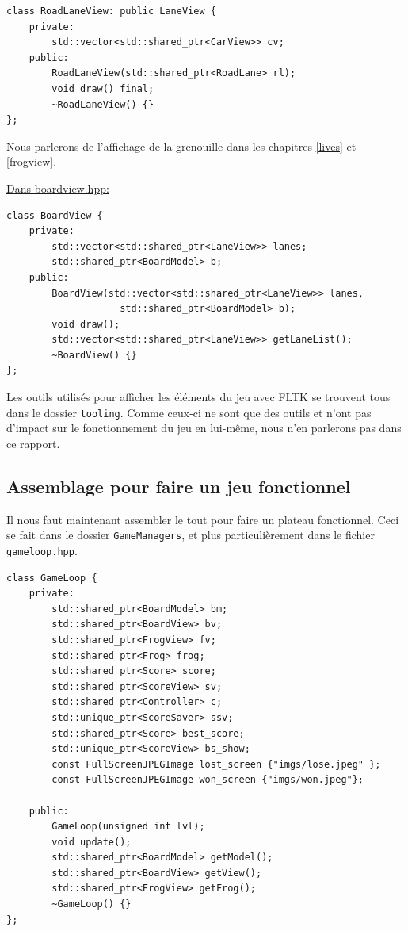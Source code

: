 \documentclass[a4paper, 12pt]{article}
\begin{document}
\begin{lstlisting}
class RoadLaneView: public LaneView {
    private:
        std::vector<std::shared_ptr<CarView>> cv;
    public:
        RoadLaneView(std::shared_ptr<RoadLane> rl);
        void draw() final;
        ~RoadLaneView() {}
};
\end{lstlisting}

Nous parlerons de l'affichage de la grenouille dans les chapitres 
\ref{lives} et \ref{frogview}. \\

\pagebreak

\underline{Dans boardview.hpp:}

\begin{lstlisting}
class BoardView {
    private:
        std::vector<std::shared_ptr<LaneView>> lanes;
        std::shared_ptr<BoardModel> b;
    public:
        BoardView(std::vector<std::shared_ptr<LaneView>> lanes,
                    std::shared_ptr<BoardModel> b);
        void draw();
        std::vector<std::shared_ptr<LaneView>> getLaneList();
        ~BoardView() {}
};
\end{lstlisting}

Les outils utilisés pour afficher les éléments du jeu avec FLTK se trouvent tous 
dans le dossier \texttt{tooling}. 
Comme ceux-ci ne sont que des outils et n'ont pas d'impact sur le fonctionnement 
du jeu en lui-même, 
nous n'en parlerons pas dans ce rapport.

\subsection{Assemblage pour faire un jeu fonctionnel}

Il nous faut maintenant assembler le tout pour faire un plateau fonctionnel. 
Ceci se fait dans le dossier \texttt{GameManagers}, et plus particulièrement 
dans le fichier \texttt{gameloop.hpp}. 

\begin{lstlisting}
class GameLoop {
    private:
        std::shared_ptr<BoardModel> bm;
        std::shared_ptr<BoardView> bv;
        std::shared_ptr<FrogView> fv;
        std::shared_ptr<Frog> frog;
        std::shared_ptr<Score> score;
        std::shared_ptr<ScoreView> sv;
        std::shared_ptr<Controller> c;
        std::unique_ptr<ScoreSaver> ssv;
        std::shared_ptr<Score> best_score;
        std::unique_ptr<ScoreView> bs_show;
        const FullScreenJPEGImage lost_screen {"imgs/lose.jpeg" };
        const FullScreenJPEGImage won_screen {"imgs/won.jpeg"};

    public:
        GameLoop(unsigned int lvl);
        void update();
        std::shared_ptr<BoardModel> getModel();
        std::shared_ptr<BoardView> getView();
        std::shared_ptr<FrogView> getFrog();
        ~GameLoop() {}
};
\end{lstlisting}
\end{document}

